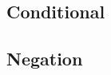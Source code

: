 \subsection*{Conditional}
\begin{multicols}{2}
\begin{fitchproof}
	\open
	\close
\end{fitchproof}
\begin{fitchproof}
	 
\end{fitchproof}
\end{multicols}
\begin{multicols}{2}
\begin{fitchproof}
	 
\end{fitchproof}
\begin{fitchproof}
\end{fitchproof}
\end{multicols}
\newpage
\subsection*{Negation}
\begin{multicols}{2}
\begin{fitchproof}
\open
\close
{}
\end{fitchproof}
\begin{fitchproof}
\open
\close
{}
\end{fitchproof}
\end{multicols}

